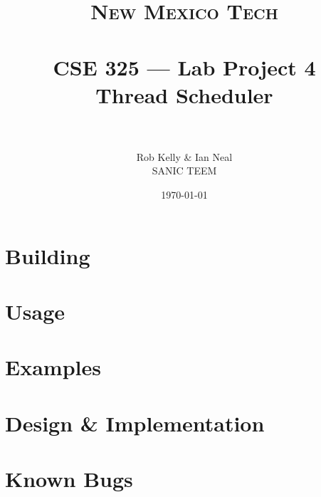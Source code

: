 \documentclass[paper=a4, fontsize=11pt]{scrartcl}
\title{
  \normalfont \normalsize 
  \textsc{New Mexico Tech} \\ [25pt]
  \horrule{0.5pt} \\[0.4cm]
  \huge CSE 325 --- Lab Project 4 \\ Thread Scheduler \\
  \horrule{2pt} \\[0.5cm]
}
\author{Rob Kelly \& Ian Neal \\ SANIC TEEM}
\date{\normalsize\today}
\begin{document}
\maketitle


\section*{Building}

\section*{Usage}

\section*{Examples}

\section*{Design \& Implementation}

\section*{Known Bugs}
\end{document}
